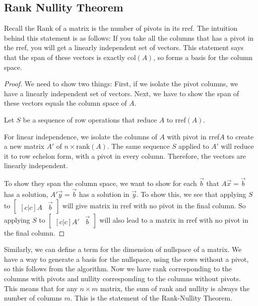 \subsection*{Rank Nullity Theorem}
Recall the Rank of a matrix is the number of pivots in its rref. 
The intuition behind this statement is as follows: If you take all the columns that has a pivot in the rref, you will get a linearly independent set of vectors. This statement says that the span of these vectors is exactly col$(A)$, so forms a basis for the column space.  
\begin{proof}
	We need to show two things: First, if we isolate the pivot columns, we have a linearly independent set of vectors. Next, we have to show the span of these vectors equals the column space of $A$.
	
	Let $S$ be a sequence of row operations that reduce $A$ to rref$(A)$.

	For linear independence, we isolate the columns of $A$ with pivot in rref$A$ to create a new matrix $A'$ of $n\times \textrm{rank}(A)$. The same sequence $S$ applied to $A'$ will reduce it to row echelon form, with a pivot in every column. Therefore, the vectors are linearly independent. 

	To show they span the column space, we want to show for each $\vec{b}$ that $A\vec{x}=\vec{b}$ has a solution, $A'\vec{y}=\vec{b}$ has a solution in $\vec{y}$. To show this, we see that applying $S$ to $
	\begin{bmatrix}[c|c]
		A &\vec{b}
	\end{bmatrix}
	$
	will give matrix in rref with no pivot in the final column. So applying $S$ to $\begin{bmatrix}[c|c]
		A' &\vec{b}
	\end{bmatrix}
	$
	will also lead to a matrix in rref with no pivot in the final column.
\end{proof}
Similarly, we can define a term for the dimension of nullspace of a matrix. 
We have a way to generate a basis for the nullspace, using the rows without a pivot, so this follows from the algorithm. 
Now we have rank corresponding to the columns with pivots and nullity corresponding to the columns without pivots. This means that for any $n\times m$ matrix, the sum of rank and nullity is always the number of columns $m$. This is the statement of the Rank-Nullity Theorem. 

